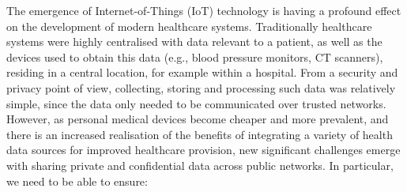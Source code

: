 \noindent
The emergence of Internet-of-Things (IoT) technology is having a profound effect on the development of modern healthcare systems. Traditionally healthcare systems were highly centralised with data relevant to a  patient,  as well as the devices used to obtain this data (e.g., blood pressure monitors, CT scanners), residing in a central location, for example within a hospital. 
From a security and privacy point of view, collecting, storing and processing such data was relatively simple, since the data only needed to be communicated over trusted networks. 
However, as personal medical devices become cheaper and more prevalent, 
and there is an increased realisation of the benefits of integrating 
a variety of health data sources for improved healthcare provision, new significant challenges emerge with  
sharing private and confidential data across public networks.
In particular, we need to be able to ensure:
